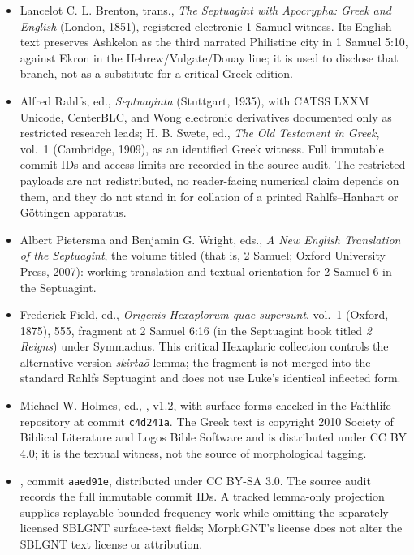 \begin{itemize}
  \item Lancelot C. L. Brenton, trans., \emph{The Septuagint with Apocrypha: Greek and English} (London, 1851), registered electronic 1 Samuel witness.  Its English text preserves Ashkelon as the third narrated Philistine city in 1 Samuel 5:10, against Ekron in the Hebrew/Vulgate/Douay line; it is used to disclose that branch, not as a substitute for a critical Greek edition.
  \item Alfred Rahlfs, ed., \emph{Septuaginta} (Stuttgart, 1935), with CATSS LXXM Unicode, CenterBLC, and Wong electronic derivatives documented only as restricted research leads; H. B. Swete, ed., \emph{The Old Testament in Greek}, vol.~1 (Cambridge, 1909), as an identified Greek witness.  Full immutable commit IDs and access limits are recorded in the source audit.  The restricted payloads are not redistributed, no reader-facing numerical claim depends on them, and they do not stand in for collation of a printed Rahlfs--Hanhart or Göttingen apparatus.
  \item Albert Pietersma and Benjamin G. Wright, eds., \emph{A New English Translation of the Septuagint}, the volume titled  (that is, 2 Samuel; Oxford University Press, 2007): working translation and textual orientation for 2 Samuel 6 in the Septuagint.
  \item Frederick Field, ed., \emph{Origenis Hexaplorum quae supersunt}, vol.~1 (Oxford, 1875), 555, fragment at 2 Samuel 6:16 (in the Septuagint book titled \emph{2 Reigns}) under Symmachus.  This critical Hexaplaric collection controls the alternative-version \emph{skirtaō} lemma; the fragment is not merged into the standard Rahlfs Septuagint and does not use Luke's identical inflected form.
  \item Michael W. Holmes, ed., , v1.2, with surface forms checked in the Faithlife repository at commit \texttt{c4d241a}.  The Greek text is copyright 2010 Society of Biblical Literature and Logos Bible Software and is distributed under CC BY 4.0; it is the textual witness, not the source of morphological tagging.
  \item {}, commit \texttt{aaed91e}, distributed under CC BY-SA 3.0.  The source audit records the full immutable commit IDs.  A tracked lemma-only projection supplies replayable bounded frequency work while omitting the separately licensed SBLGNT surface-text fields; MorphGNT's license does not alter the SBLGNT text license or attribution.
\end{itemize}


